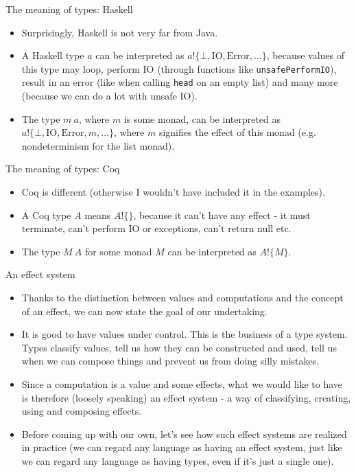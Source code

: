 \documentclass{beamer}
\newcommand{\eff}[2]{#1 ! \{ #2 \}}
\begin{document}
\begin{frame}{The meaning of types: Haskell}
\begin{itemize}
	\item Surprisingly, Haskell is not very far from Java.
	\item A Haskell type $a$ can be interpreted as $\eff{a}{\bot, \text{IO}, \text{Error}, \dots}$, because values of this type may loop, perform IO (through functions like \texttt{unsafePerformIO}), result in an error (like when calling \texttt{head} on an empty list) and many more (because we can do a lot with unsafe IO).
	\item The type $m\ a$, where $m$ is some monad, can be interpreted as $\eff{a}{\bot, \text{IO}, \text{Error}, m, \dots}$, where $m$ signifies the effect of this monad (e.g. nondeterminism for the list monad).
\end{itemize}
\end{frame}

\begin{frame}{The meaning of types: Coq}
\begin{itemize}
	\item Coq is different (otherwise I wouldn't have included it in the examples).
	\item A Coq type $A$ means $\eff{A}{}$, because it can't have any effect - it must terminate, can't perform IO or exceptions, can't return null etc.
	\item The type $M\ A$ for some monad $M$ can be interpreted as $\eff{A}{M}$.
\end{itemize}
\end{frame}

\begin{frame}{An effect system}
\begin{itemize}
	\item Thanks to the distinction between values and computations and the concept of an effect, we can now state the goal of our undertaking.
	\item It is good to have values under control. This is the business of a type system. Types classify values, tell us how they can be constructed and used, tell us when we can compose things and prevent us from doing silly mistakes.
	\item Since a computation is a value and some effects, what we would like to have is therefore (loosely speaking) an effect system - a way of classifying, creating, using and composing effects.
	\item Before coming up with our own, let's see how such effect systems are realized in practice (we can regard any language as having an effect system, just like we can regard any language as having types, even if it's just a single one).
\end{itemize}
\end{frame}
\end{document}

